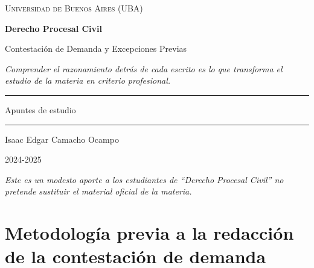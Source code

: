 \documentclass[12pt,oneside]{book}
\newcommand{\universidad}{Universidad de Buenos Aires (UBA)}
\newcommand{\materia}{Derecho Procesal Civil}
\newcommand{\titulo}{Contestación de Demanda y Excepciones Previas}
\newcommand{\autor}{Isaac Edgar Camacho Ocampo}
\newcommand{\anio}{2024-2025}
\begin{document}
\begin{titlepage}

\thispagestyle{empty}

\begin{center}

\vspace*{1cm}

{\large \textsc{\universidad}}

\vspace{3cm}

{\Huge \textbf{\materia}}

\vspace{1cm}

{\LARGE \titulo}

\vspace{0.8cm}

\textit{Comprender el razonamiento detrás de cada escrito es lo que transforma el estudio de la materia en criterio profesional.}

\vspace{1.2cm}

\rule{0.70\textwidth}{0.5pt}

\vspace{0.5cm}

{\large Apuntes de estudio}

\vspace{0.5cm}

\rule{0.70\textwidth}{0.5pt}

\vfill

{\large \autor}

\vspace{0.3cm}

{\large \anio}

\end{center}

\vfill

\begin{flushleft}
\textit{Este es un modesto aporte a los estudiantes de ``Derecho Procesal Civil'' no pretende sustituir el material oficial de la materia.}
\end{flushleft}

\end{titlepage}

\tableofcontents
\clearpage

\chapter{Metodología previa a la redacción de la contestación de demanda}
\end{document}
